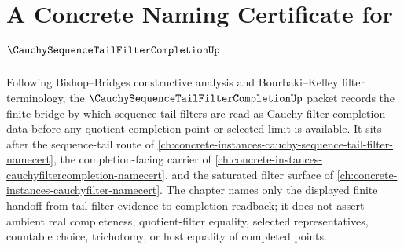 \chapter{A Concrete Naming Certificate for $\CauchySequenceTailFilterCompletionUp$}
\label{ch:concrete-instances-cauchy-sequence-tail-filter-completion-namecert}

Following Bishop--Bridges constructive analysis and Bourbaki--Kelley filter terminology, the $\CauchySequenceTailFilterCompletionUp$ packet records the finite bridge by which sequence-tail filters are read as Cauchy-filter completion data before any quotient completion point or selected limit is available. It sits after the sequence-tail route of \autoref{ch:concrete-instances-cauchy-sequence-tail-filter-namecert}, the completion-facing carrier of \autoref{ch:concrete-instances-cauchyfiltercompletion-namecert}, and the saturated filter surface of \autoref{ch:concrete-instances-cauchyfilter-namecert}. The chapter names only the displayed finite handoff from tail-filter evidence to completion readback; it does not assert ambient real completeness, quotient-filter equality, selected representatives, countable choice, trichotomy, or host equality of completed points.

